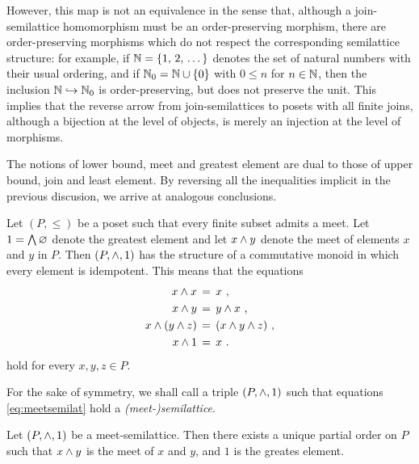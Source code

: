 However, this map is not an equivalence in the sense that, although a
join-semilattice homomorphism must be an order-preserving morphism, there
are order-preserving morphisms which do not respect the corresponding
semilattice structure: for example, if $\mathbb{N}=\{1,\,2,\,\dots\}$
denotes the set of natural numbers with their usual ordering, and if
$\mathbb{N}_{0}=\mathbb{N}\cup\{0\}$ with $0\leq n$ for $n\in\mathbb{N}$, then
the inclusion $\mathbb{N}\hookrightarrow\mathbb{N}_{0}$ is order-preserving,
but does not preserve the unit. This implies that the reverse arrow
from join-semilattices to posets with all finite joins, although a
bijection at the level of objects, is merely an injection at the level of
morphisms.

The notions of lower bound, meet and greatest element are dual to those
of upper bound, join and least element. By reversing all the inequalities
implicit in the previous discusion, we arrive at analogous conclusions.

\begin{thmMeetSemilat}\label{thm:meetsemilat}
	Let $(P,\leq)$ be a poset such that every finite subset admits a
	meet. Let $1=\bigwedge\varnothing$ denote the greatest element
	and let $x\wedge y$ denote the meet of elements $x$ and $y$ in $P$.
	Then $(P,\wedge,1)$ has the structure of a commutative monoid
	in which every element is idempotent. This means that the equations
	\begin{equation}
		\label{eq:meetsemilat}
		\begin{aligned}
			x\wedge x & \,=\, x\text{ ,}\\
			x\wedge y & \,=\, y\wedge x\text{ ,}\\
			x\wedge(y\wedge z) & \,=\,
				(x\wedge y\wedge z)\text{ ,}\\
			x\wedge 1 & \,=\, x
				\text{ .}
		\end{aligned}
	\end{equation}
	hold for every $x,y,z\in P$.
\end{thmMeetSemilat}

For the sake of symmetry, we shall call a triple $(P,\wedge,1)$
such that equations \eqref{eq:meetsemilat} hold a \emph{(meet-)semilattice}.

\begin{thmMeetSemilatChar}\label{thm:meetsemilatchar}
	Let $(P,\wedge,1)$ be a meet-semilattice. Then there exists a
	unique partial order on $P$ such that $x\wedge y$ is the meet
	of $x$ and $y$, and $1$ is the greates element.
\end{thmMeetSemilatChar}

